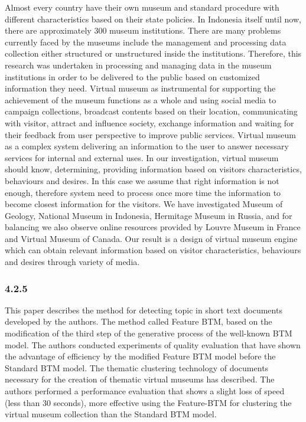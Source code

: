 Almost every country have their own museum and standard procedure with different characteristics based on their state policies. In Indonesia itself until now, there are approximately 300 museum institutions. There are many problems currently faced by the museums include the management and processing data collection either structured or unstructured inside the institutions. Therefore, this research was undertaken in processing and managing data in the museum institutions in order to be delivered to the public based on customized information they need. Virtual museum as instrumental for supporting the achievement of the museum functions as a whole and using social media to campaign collections, broadcast contents based on their location, communicating with visitor, attract and influence society, exchange information and waiting for their feedback from user perspective to improve public services. Virtual museum as a complex system delivering an information to the user to answer necessary services for internal and external uses. In our investigation, virtual museum should know, determining, providing information based on visitors characteristics, behaviours and desires. In this case we assume that right information is not enough, therefore system need to process once more time the information to become closest information for the visitors. We have investigated Museum of Geology, National Museum in Indonesia, Hermitage Museum in Russia, and for balancing we also observe online resources provided by Louvre Museum in France and Virtual Museum of Canada. Our result is a design of virtual museum engine which can obtain relevant information based on visitor characteristics, behaviours and desires through variety of media.

\subsubsection{4.2.5}

This paper describes the method for detecting topic in short text documents developed by the authors. The method called Feature BTM, based on the modification of the third step of the generative process of the well-known BTM model. The authors conducted experiments of quality evaluation that have shown the advantage of efficiency by the modified Feature BTM model before the Standard BTM model. The thematic clustering technology of documents necessary for the creation of thematic virtual museums has described. The authors performed a performance evaluation that shows a slight loss of speed (less than 30 seconds), more effective using the Feature-BTM for clustering the virtual museum collection than the Standard BTM model.

